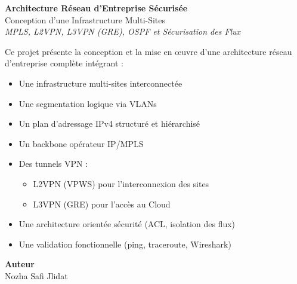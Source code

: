 \documentclass[12pt,a4paper, oneside]{memoir}
\begin{document}
	
	\vspace*{0.85cm}
	
	\begin{center}
		
		{\Huge \textbf{Architecture Réseau d’Entreprise Sécurisée}}\\[0.45cm]
		
		{\Large Conception d’une Infrastructure Multi-Sites}\\[0.9cm]
		
		{\large \textit{MPLS, L2VPN, L3VPN (GRE), OSPF et Sécurisation des Flux}}\\[1cm]
		
		\begin{tcolorbox}[colback=gray!5,colframe=black,width=1\textwidth,sharp corners,boxrule=1pt]
			\centering
			\large
			Ce projet présente la conception et la mise en œuvre d’une architecture réseau d’entreprise complète intégrant :
			
			\vspace{0.3cm}
			
			\begin{itemize}
				\item Une infrastructure multi-sites interconnectée
				\item Une segmentation logique via VLANs
				\item Un plan d’adressage IPv4 structuré et hiérarchisé
				\item Un backbone opérateur IP/MPLS
				\item Des tunnels VPN :
				\begin{itemize}
					\item L2VPN (VPWS) pour l’interconnexion des sites
					\item L3VPN (GRE) pour l’accès au Cloud
				\end{itemize}
				\item Une architecture orientée sécurité (ACL, isolation des flux)
				\item Une validation fonctionnelle (ping, traceroute, Wireshark)
			\end{itemize}
			
		\end{tcolorbox}

		\vspace{1cm}
		
		\textbf{Auteur}\\
		Nozha Safi Jlidat
		
		\vspace{0.5cm}
		

\end{center}
\end{document}
